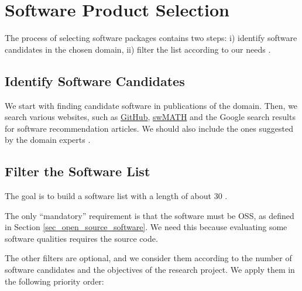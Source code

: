 \section{Software Product Selection}
\label{sec_software_selection}

The process of selecting software packages contains two steps: i) identify software candidates in the chosen domain, ii) filter the list according to our needs \cite{SmithEtAl2021}.

\subsection{Identify Software Candidates}
\label{sec_identify_software_candidates}
We start with finding candidate software in publications of the domain. Then, we search various websites, such as \hyperlink{https://github.com/}{GitHub}, \hyperlink{https://swmath.org/}{swMATH} and the Google search results for software recommendation articles. We should also include the ones suggested by the domain experts \cite{SmithEtAl2021}.

\subsection{Filter the Software List}
\label{sec_filter_software_list}
The goal is to build a software list with a length of about 30 \cite{SmithEtAl2021}.

The only ``mandatory'' requirement is that the software must be OSS, as defined in Section \ref{sec_open_source_software}. We need this because evaluating some software qualities requires the source code.

The other filters are optional, and we consider them according to the number of software candidates and the objectives of the research project. We apply them in the following priority order:

